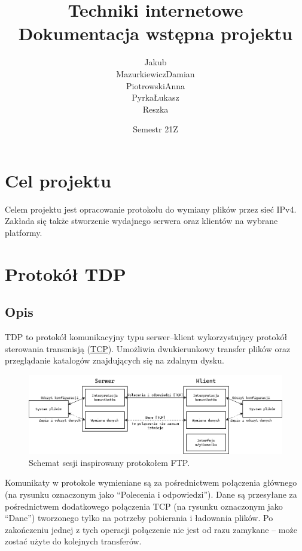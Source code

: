 \documentclass[10pt,a4paper]{article}
\title{Techniki internetowe \\ \large Dokumentacja wstępna projektu \quotes{TinDox}}
\author{
    \begin{tabular}{p{6em}p{6em}p{6em}p{6em}}
        \makecell{Jakub \\ Mazurkiewicz} &
        \makecell{Damian \\ Piotrowski} &
        \makecell{Anna \\ Pyrka} &
        \makecell{Łukasz \\ Reszka}
    \end{tabular}
}
\date{Semestr 21Z}
\newcommand{\quotes}[1]{``#1''}
\begin{document}
\maketitle
\tableofcontents
\pagebreak

\section{Cel projektu}
Celem projektu jest opracowanie protokołu do wymiany plików przez sieć IPv4. Zakłada się także stworzenie wydajnego serwera oraz klientów na wybrane platformy.

\section{Protokół TDP}

\subsection{Opis}
TDP to protokół komunikacyjny typu serwer--klient wykorzystujący protokół sterowania transmisją (\href{https://en.wikipedia.org/wiki/Transmission_Control_Protocol}{TCP}). Umożliwia dwukierunkowy transfer plików oraz przeglądanie katalogów znajdujących się na zdalnym dysku.

\begin{figure}[ht]
\centering
\includegraphics[width=1.001\textwidth]{./img/session.png}
\caption{\label{fig:session.png}Schemat sesji inspirowany protokołem FTP.}
\end{figure}
\FloatBarrier

Komunikaty w protokole wymieniane są za pośrednictwem połączenia głównego (na rysunku oznaczonym jako \quotes{Polecenia i odpowiedzi}). Dane są przesyłane za pośrednictwem dodatkowego połączenia TCP (na rysunku oznaczonym jako \quotes{Dane}) tworzonego tylko na potrzeby pobierania i ładowania plików. Po zakończeniu jednej z tych operacji połączenie nie jest od razu zamykane -- może zostać użyte do kolejnych transferów.
\end{document}
